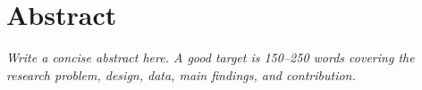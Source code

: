 \documentclass[a4paper,12pt,openany]{report}
\begin{document}
\hypersetup{pageanchor=false}

\clearpage
\hypersetup{pageanchor=true}

\setcounter{page}{1}
\chapter*{Abstract}
\textit{Write a concise abstract here. A good target is 150--250 words covering the research problem, design, data, main findings, and contribution.}

\clearpage
\tableofcontents
\clearpage

\setcounter{page}{1}









\clearpage


\appendix



\end{document}
